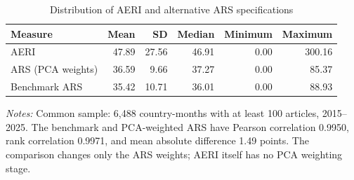 \begin{table}[htbp]\centering\small\singlespacing
\caption{Distribution of AERI and alternative ARS specifications}\label{tab:comparison}
\setlength{\tabcolsep}{4pt}
\begin{tabular}{lrrrrr}\toprule
Measure & Mean & SD & Median & Minimum & Maximum\\\midrule
AERI & 47.89 & 27.56 & 46.91 & 0.00 & 300.16\\
ARS (PCA weights) & 36.59 & 9.66 & 37.27 & 0.00 & 85.37\\
Benchmark ARS & 35.42 & 10.71 & 36.01 & 0.00 & 88.93\\
\bottomrule\end{tabular}
\par\medskip\raggedright\footnotesize\textit{Notes:} Common sample: 6,488 country-months with at least 100 articles, 2015--2025. The benchmark and PCA-weighted ARS have Pearson correlation 0.9950, rank correlation 0.9971, and mean absolute difference 1.49 points. The comparison changes only the ARS weights; AERI itself has no PCA weighting stage.
\end{table}